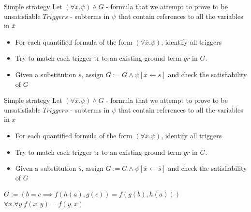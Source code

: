 \documentclass{beamer}
\begin{document}
\begin{frame}{Simple strategy}
Let $(\forall\overline{x}.\psi) \wedge G$ - formula that we attempt to prove to be unsatisfiable\newline
$Triggers$ - subterms in $\psi$ that contain references to all the variables in $\overline{x}$\newline
\begin{itemize}
\item For each quantified formula of the form $(\forall\overline{x}.\psi)$, identify all triggers
\item Try to match each trigger tr to an existing ground term $gr$ in $G$.
\item Given a substitution $\overline{s}$, assign $G := G \wedge \psi[\overline{x}\leftarrow\overline{s}]$ and check the satisfiability of
$G$
\end{itemize}
\end{frame}

\begin{frame}{Simple strategy}
Let $(\forall\overline{x}.\psi) \wedge G$ - formula that we attempt to prove to be unsatisfiable\newline
$Triggers$ - subterms in $\psi$ that contain references to all the variables in $\overline{x}$\newline
\begin{itemize}
\item For each quantified formula of the form $(\forall\overline{x}.\psi)$, identify all triggers
\item Try to match each trigger tr to an existing ground term $gr$ in $G$.
\item Given a substitution $\overline{s}$, assign $G := G \wedge \psi[\overline{x}\leftarrow\overline{s}]$ and check the satisfiability of
$G$
\end{itemize}
$G := (b = c \implies f(h(a), g(c)) = f(g(b), h(a)))$\newline
$\forall x.\forall y.f(x, y) = f(y, x)$\newline
\end{frame}
\end{document}
